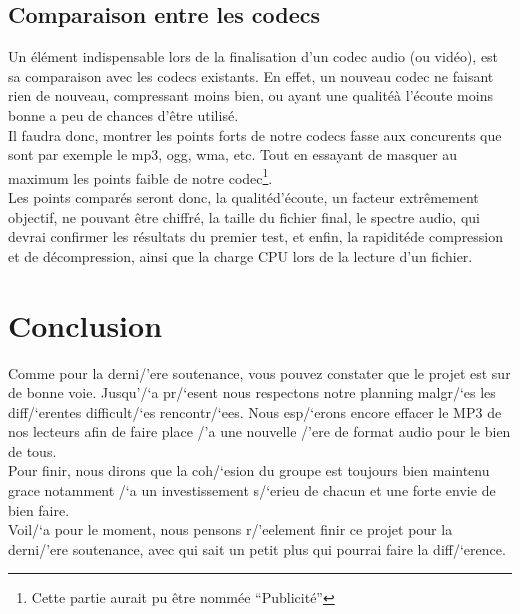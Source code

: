 \documentclass[a4paper,12pt]{article}
\begin{document}
	\subsection{Comparaison entre les codecs}
Un \'el\'ement indispensable lors de la finalisation d'un codec audio (ou vid\'eo),
est sa comparaison avec les codecs existants. En effet, un nouveau codec ne
faisant rien de nouveau, compressant moins bien, ou ayant une qualit\'eà l'\'ecoute
moins bonne a peu de chances d'\^etre utilis\'e.\\
Il faudra donc, montrer les points forts de notre codecs fasse aux concurents
que sont par exemple le mp3, ogg, wma, etc. Tout en essayant de masquer au
maximum les points faible de notre codec\footnote{Cette partie aurait pu \^etre
nomm\'ee ``Publicit\'e''}.\\
Les points compar\'es seront donc, la qualit\'ed'\'ecoute, un facteur extr\^emement
objectif, ne pouvant \^etre chiffr\'e, la taille du fichier final, le spectre audio,
qui devrai confirmer les r\'esultats du premier test, et enfin, la rapidit\'ede
compression et de d\'ecompression, ainsi que la charge CPU lors de la lecture d'un
fichier.

\newpage

\section*{Conclusion}
Comme pour la derni/'ere soutenance, vous pouvez constater que le projet est sur de bonne voie. Jusqu'/`a pr/`esent nous respectons notre planning malgr/`es les diff/`erentes difficult/`es rencontr/`ees. Nous esp/`erons encore effacer le MP3 de nos lecteurs afin de faire place /'a une nouvelle /'ere de format audio pour le bien de tous.\\
Pour finir, nous dirons que la coh/`esion du groupe est toujours bien maintenu grace notamment /`a un investissement s/`erieu de chacun et une forte envie de bien faire.\\
Voil/`a pour le moment, nous pensons r/'eelement finir ce projet pour la derni/'ere soutenance, avec qui sait un petit plus qui pourrai faire la diff/`erence. 
\end{document}
